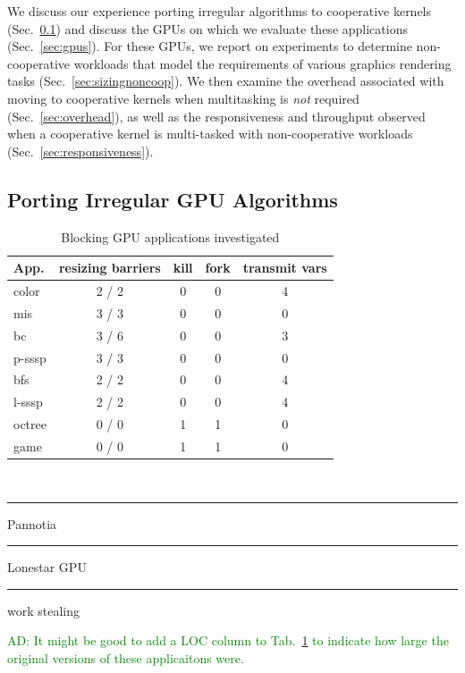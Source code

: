 \documentclass[numbers,nocopyrightspace,10pt]{sigplanconf}
\newcommand\crule[3][black]{\textcolor{#1}{\rule{#2}{#3}}}
\newcommand{\ADComment}[1]{\textcolor{green}{AD: #1}}
\newcommand{\mytab}{Tab.~}
\newcommand{\mysec}{Sec.~}
\begin{document}
We discuss our experience porting irregular algorithms to cooperative kernels (\mysec\ref{sec:portingalgorithms}) and discuss the GPUs on which we evaluate these applications (\mysec\ref{sec:gpus}).  For these GPUs, we report on experiments to determine non-cooperative workloads that model the requirements of various graphics rendering tasks (\mysec\ref{sec:sizingnoncoop}).  We then examine the overhead associated with moving to cooperative kernels when multitasking is \emph{not} required (\mysec\ref{sec:overhead}), as well as the responsiveness and throughput observed when a cooperative kernel is multi-tasked with non-cooperative workloads (\mysec\ref{sec:responsiveness}).

\subsection{Porting Irregular GPU Algorithms}\label{sec:portingalgorithms}

\begin{table}
\small
\centering
\begin{tabular}{ l c c c c }
App. & resizing barriers & kill & fork & transmit vars\\
\hline
\rowcolor{Gray1}
color & 2 / 2 & 0 & 0 & 4\\
\rowcolor{Gray1}
mis & 3 / 3 & 0 & 0 & 0\\
\rowcolor{Gray1}
bc & 3 / 6 & 0 & 0 & 3\\
\rowcolor{Gray1}
p-sssp & 3 / 3 & 0 & 0 & 0 \\
\rowcolor{Gray2}
bfs & 2 / 2 & 0 & 0  & 4 \\
\rowcolor{Gray2}
l-sssp & 2 / 2 & 0 & 0  & 4 \\
\rowcolor{Gray3}
octree & 0 / 0 & 1 & 1 & 0\\
\rowcolor{Gray3}
game & 0 / 0 & 1 & 1 & 0\\
\end{tabular} \\
\vspace{.2cm}
\crule[Gray1]{.2cm}{.2cm} Pannotia \hspace{.4cm} \crule[Gray2]{.2cm}{.2cm} Lonestar GPU  \hspace{.4cm}  \crule[Gray3]{.2cm}{.2cm} work stealing
\caption{Blocking GPU applications investigated}
\label{tab:applications}
\end{table}

\ADComment{It might be good to add a LOC column to \mytab\ref{tab:applications} to indicate how large the original versions of these applicaitons were.}
\end{document}
